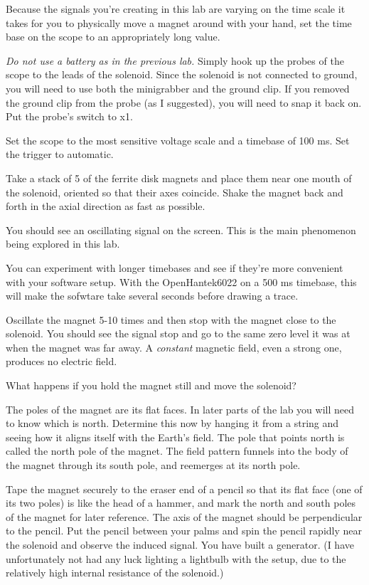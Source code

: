 Because the signals you're creating in this lab are varying on the time scale
it takes for you to physically move a magnet around with your hand, set the
time base on the scope to an appropriately long value.


\emph{Do not use a battery as in the previous lab.} Simply hook up
the probes of the scope to the leads of the solenoid. Since the solenoid
is not connected to ground, you will need to use both the minigrabber and
the ground clip. If you removed the ground clip from the probe (as I suggested),
you will need to snap it back on. Put the probe's switch to x1.

Set the scope to the most sensitive voltage scale and a timebase of 100 ms.
Set the trigger to automatic.

Take a stack of 5 of the ferrite disk magnets and place them near one
mouth of the solenoid, oriented so that their axes coincide. Shake the
magnet back and forth in the axial direction as fast as possible.

You should see an oscillating signal on the screen. This is the main phenomenon
being explored in this lab.

You can experiment with longer timebases and see if they're more convenient with
your software setup. With the OpenHantek6022 on a 500 ms timebase, this will make the sofwtare take
several seconds before drawing a trace.


Oscillate the magnet 5-10 times and then stop with the magnet close to the solenoid.
You should see the signal stop and go to the same zero level it was at when the
magnet was far away. A \emph{constant} magnetic field, even a strong one, produces no
electric field.


What happens if you hold the magnet still and move the solenoid? 

The poles of the magnet are its flat faces. In later parts
of the lab you will need to know which is north. Determine
this now by hanging it from a string and seeing how it aligns itself with the Earth's field.
The pole that points north is called the north pole of the
magnet. The field pattern funnels into the body of the magnet
through its south pole, and reemerges at its north pole.


Tape the magnet securely to the eraser end of a pencil so
that its flat face (one of its two poles) is like the head
of a hammer, and mark the north and south poles of the
magnet for later reference. The axis of the magnet should be
perpendicular to the pencil. Put the pencil between your palms and spin the pencil rapidly near the
solenoid and observe the induced signal. You have built a
generator. (I have unfortunately not had any luck lighting a
lightbulb with the setup, due to the relatively high
internal resistance of the solenoid.)

